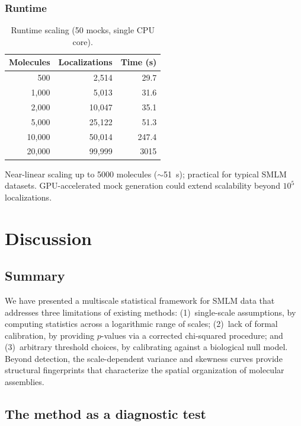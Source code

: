\documentclass[11pt]{article}
\begin{document}
\subsubsection{Runtime}
\label{sec:exp-h}

\begin{table}[ht]
\centering
\caption{Runtime scaling (50 mocks, single CPU core).}
\label{tab:runtime}
\begin{tabular}{rrr}
\toprule
Molecules & Localizations & Time (s) \\
\midrule
500    & 2,514    & 29.7  \\
1,000  & 5,013    & 31.6  \\
2,000  & 10,047   & 35.1  \\
5,000  & 25,122   & 51.3  \\
10,000 & 50,014   & 247.4 \\
20,000 & 99,999   & 3015  \\
\bottomrule
\end{tabular}
\end{table}

Near-linear scaling up to 5000 molecules ($\sim$51~s); practical for
typical SMLM datasets. GPU-accelerated mock generation could extend
scalability beyond $10^5$ localizations.

\section{Discussion}
\label{sec:discussion}

\subsection{Summary}

We have presented a multiscale statistical framework for SMLM data that
addresses three limitations of existing methods: (1)~single-scale
assumptions, by computing statistics across a logarithmic range of
scales; (2)~lack of formal calibration, by providing $p$-values via a
corrected chi-squared procedure; and (3)~arbitrary threshold choices, by
calibrating against a biological null model. Beyond detection, the
scale-dependent variance and skewness curves provide structural
fingerprints that characterize the spatial organization of molecular
assemblies.

\subsection{The method as a diagnostic test}
\end{document}
